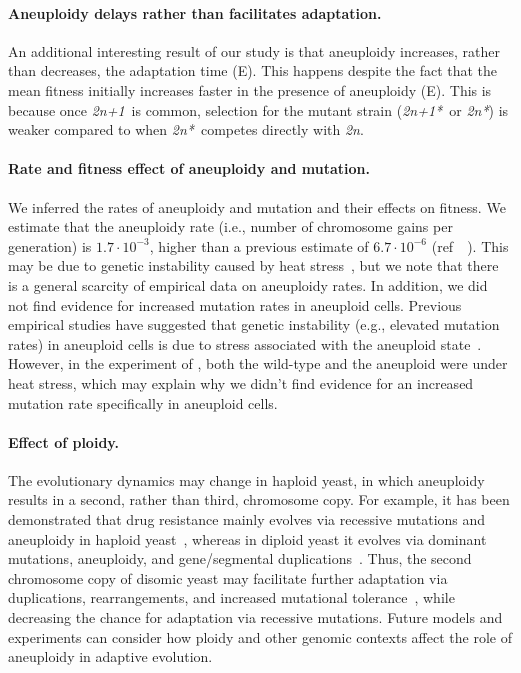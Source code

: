 \documentclass[12pt]{extarticle}
\newcommand{\euwt}{\emph{2n}}
\newcommand{\anwt}{\emph{2n+1}}
\newcommand{\eumt}{\emph{2n*}}
\newcommand{\anmt}{\emph{2n+1*}}
\begin{document}
\paragraph{Aneuploidy delays rather than facilitates adaptation.}
An additional interesting result of our study is that aneuploidy increases, rather than decreases, the adaptation time (E). 
This happens despite the fact that the mean fitness initially increases faster in the presence of aneuploidy (E). 
This is because once \anwt\ is common, selection for the mutant strain (\anmt\ or \eumt) is weaker compared to when \eumt\ competes directly with \euwt.

\paragraph{Rate and fitness effect of aneuploidy and mutation.}
We inferred the rates of aneuploidy and mutation and their effects on fitness. 
We estimate that the aneuploidy rate (i.e., number of chromosome gains per generation) is $1.7 \cdot 10^{-3}$, higher than a previous estimate of $6.7 \cdot 10^{-6}$ (ref~~\citep{Zhu2016}). This may be due to genetic instability caused by heat stress~\citep{Chen2012a}, but we note that there is a general scarcity of empirical data on aneuploidy rates.
In addition, we did not find evidence for increased mutation rates in aneuploid cells. 
Previous empirical studies have suggested that genetic instability (e.g., elevated mutation rates) in aneuploid cells is due to stress associated with the aneuploid state~\citep{Bouchonville2009, Chen2012b, Zhu2012, Ippolito2021b}.
However, in the experiment of \citet{Yona2012}, both the wild-type and the aneuploid were under heat stress, which may explain why we didn't find evidence for an increased mutation rate specifically in aneuploid cells.

\paragraph{Effect of ploidy.}
The evolutionary dynamics may change in haploid yeast, in which aneuploidy results in a second, rather than third, chromosome copy. 
For example, it has been demonstrated that drug resistance mainly evolves via recessive mutations and aneuploidy in haploid yeast~\citep{Soncini2020}, whereas in diploid yeast it evolves via dominant mutations, aneuploidy, and gene/segmental duplications~\citep{Barney2021}.
Thus, the second chromosome copy of disomic yeast may facilitate further adaptation via duplications, rearrangements, and increased mutational tolerance~\citep{Avecilla2023}, while decreasing the chance for adaptation via recessive mutations. 
Future models and experiments can consider how ploidy and other genomic contexts affect the role of aneuploidy in adaptive evolution.
\end{document}
